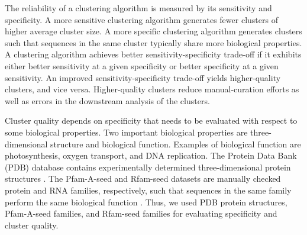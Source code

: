 \documentclass[11pt,letterpaper]{article}
\begin{document}
The reliability of a clustering algorithm is measured by its sensitivity and specificity.
A more sensitive clustering algorithm generates fewer clusters of higher average cluster size.
A more specific clustering algorithm generates clusters such that sequences in the same cluster typically share more biological properties.
A clustering algorithm achieves better sensitivity-specificity trade-off if it exhibits either better sensitivity at a given specificity or better specificity at a given sensitivity.
An improved sensitivity-specificity trade-off yields higher-quality clusters, and vice versa.
Higher-quality clusters reduce manual-curation efforts as well as errors in the downstream analysis of the clusters.

Cluster quality depends on specificity that needs to be evaluated with respect to some biological properties.
Two %
important biological properties are three-dimensional structure and biological function.
Examples of biological function are photosynthesis, oxygen transport, and DNA replication.
The Protein Data Bank (PDB) database contains experimentally determined three-dimensional protein structures \cite{berman2006protein}.
The Pfam-A-seed and Rfam-seed datasets are manually checked protein and RNA families, respectively, such that sequences in the same family perform the same biological function \citep{finn2016pfam,nawrocki2014rfam}.
Thus, we used PDB protein structures, Pfam-A-seed families, and Rfam-seed families for evaluating specificity and cluster quality.
\end{document}
